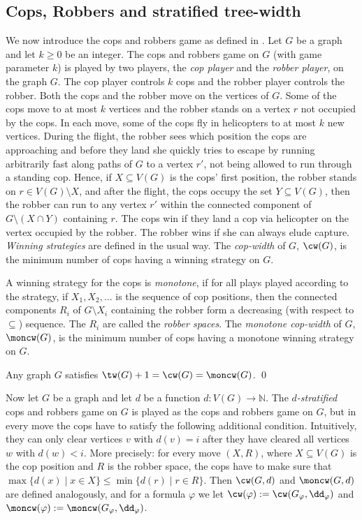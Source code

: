 \documentclass{LMCS}
\newcommand{\gfi}{G_{\varphi}}
\renewcommand{\phi}{\varphi}
\newcommand{\ad}{\dd_{\varphi}}
\begin{document}
\subsection{Cops, Robbers and stratified tree-width}
We now introduce the cops and robbers game as defined
in \cite{seytho93}.
Let $G$ be a graph and let $k\geq 0$ be an integer.
The cops and robbers game on $G$
(with game parameter $k$) is played by two players, the
\emph{cop player} and the \emph{robber player}, on the graph $G$. 
The cop player controls $k$ cops and the robber player controls 
the robber.
Both the cops and the robber move on the vertices of $G$.
Some of the cops move to at most $k$ vertices and the robber stands on
a vertex $r$ not occupied by the cops.
In each move, some of the cops fly in helicopters 
to at most $k$ new vertices. 
During the flight, the robber sees which position the 
cops are approaching and before they land she quickly tries to 
escape by running arbitrarily fast along paths of $G$
to a vertex $r'$, 
not being allowed to run through a standing cop.
Hence, if $X\subseteq V(G)$ is the cops' first position,
the robber stands on $r\in V(G)\setminus X$, and
after the flight, the cops occupy the set $Y\subseteq V(G)$,
then the robber can run to any vertex $r'$ within
the connected component of $G\setminus (X\cap Y)$ containing $r$.
The cops win if they 
land a cop via helicopter on the vertex occupied by the robber.
The robber wins if she can always elude capture.
\emph{Winning strategies} are defined in the usual way.
The \emph{cop-width} of $G$, $\cw(G)$, is the minimum number of
cops having a winning strategy on $G$.

A winning strategy for the cops is \emph{monotone}, 
if for all plays played according to the strategy, 
if $X_1,X_2,\ldots$ is the sequence of cop positions, then 
the connected components $R_i$ of $G\setminus X_i$ containing the
robber form a decreasing (with respect to $\subseteq$) 
sequence.
The $R_i$ are called the \emph{robber spaces}. 
The \emph{monotone cop-width} of $G$, $\moncw(G)$, is the minimum number of
cops having a monotone winning strategy on $G$.

\begin{thm}\label{theo:seytho}
	Any graph $G$ satisfies $\tw(G)+1=\cw(G)=\moncw(G)$.
\qed\end{thm}

Now let $G$ be a graph and let $d$ be a function $d\colon V(G)\to\mathbb N$.
The \emph{$d$-stratified} cops and robbers game on $G$ 
is played as the cops and robbers game on $G$, 
but in every move the cops have to satisfy the following additional
condition. Intuitively, they can only clear vertices $v$ with $d(v)=i$
after they have cleared all vertices $w$ with $d(w)<i$.
More precisely:
for every move $(X,R)$, where $X\subseteq V(G)$ is the cop position
and $R$ is the robber space, the cops have to make sure that
$\max\{d(x)\mid x\in X\}\leq\min\{d(r)\mid r\in R\}$.
Then $\cw(G,d)$ and $\moncw(G,d)$ are defined
analogously, and for a formula $\phi$ we let
$\cw(\phi):=\cw(\gfi,\ad)$ and $\moncw(\phi):=\moncw(\gfi,\ad)$.
\end{document}

